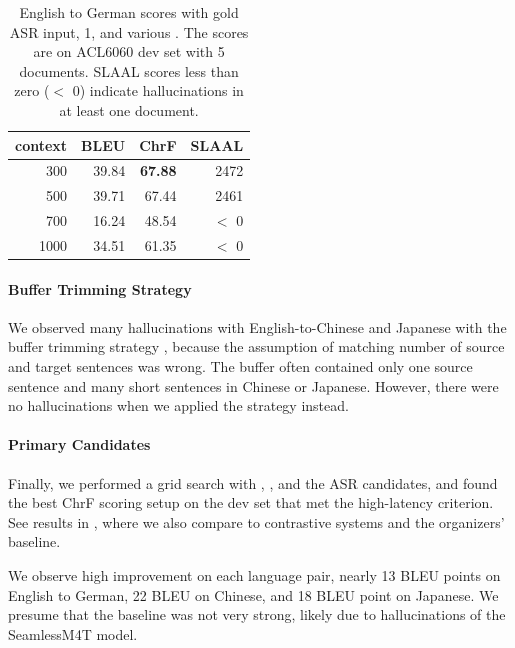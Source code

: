 \documentclass[11pt]{article}
\begin{document}
\begin{table}[]
    \centering
    \begin{tabular}{r|rrr}
context & BLEU & ChrF & SLAAL \\
\hline
300 & 39.84 & \textbf{67.88} & 2472 \\
500 & 39.71 & 67.44 & 2461 \\
700 & 16.24 & 48.54 & $<$ 0 \\
1000 & 34.51 & 61.35 & $<$ 0 \\
    \end{tabular}
    \caption{English to German scores with gold ASR input, \MinChunkSize{} 1, and various \MaxContextLen{}. The scores are on ACL6060 dev set with 5 documents. SLAAL scores less than zero ($<$ 0) indicate hallucinations in at least one document.}
    \label{tab:gold-ende}
\end{table}

\paragraph{Buffer Trimming Strategy} We observed many hallucinations with English-to-Chinese and Japanese with the buffer trimming strategy \Sentences{}, because the assumption of matching number of source and target sentences was wrong. The buffer often contained only one source sentence and many short sentences in Chinese or Japanese. However, there were no hallucinations when we applied the \Segments{} strategy instead.

\paragraph{Primary Candidates}
Finally, we performed a grid search with \MinChunkSize{}, \MaxContextLen{}, and the ASR candidates, and found the best ChrF scoring setup on the dev set that met the high-latency criterion. See results in , where we also compare to contrastive systems and the organizers' baseline. 

We observe high improvement on each language pair, nearly 13 BLEU points on English to German, 22 BLEU on Chinese, and 18 BLEU point on Japanese. We presume that the baseline was not very strong, likely due to hallucinations of the SeamlessM4T model.
\end{document}
